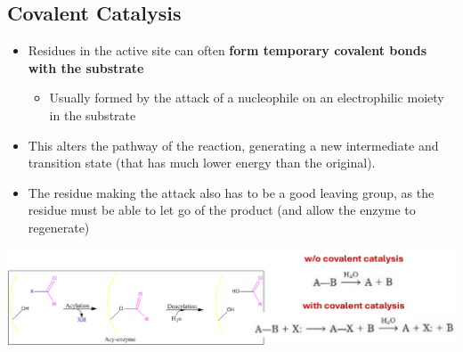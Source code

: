 \documentclass[10pt]{article}
\begin{document}
\subsection*{Covalent Catalysis}
\begin{itemize}
    \item Residues in the active site can often \textbf{form temporary covalent bonds with the substrate}
    \begin{itemize}
        \item Usually formed by the attack of a nucleophile on an electrophilic moiety in the substrate
    \end{itemize}
    \item This alters the pathway of the reaction, generating a new intermediate and transition state (that has much lower energy than the original).
    \item The residue making the attack also has to be a good leaving group, as the residue must be able to let go of the product (and allow the enzyme to regenerate)
\end{itemize}
\begin{center}
    \includegraphics*[width=\textwidth]{L2_15.png} 
\end{center}
\end{document}

